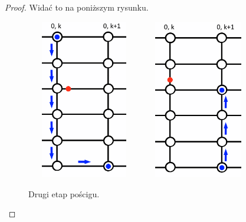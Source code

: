 \documentclass{xmgr}
\theoremstyle{definition}
\begin{document}
\begin{proof}
	Widać to na poniższym rysunku. 
	\begin{figure}[ht!]
	  \centering
	  \includegraphics[width=5cm,height=7cm]{rysunki/poscig_2.png}
    \includegraphics[width=5cm,height=7cm]{rysunki/poscig_3.png}
	  \caption{Drugi etap pościgu.}
	  \label{fig:drugi krok}
	\end{figure}


\end{proof}
\end{document}
